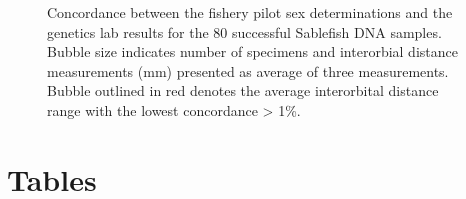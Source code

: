 \documentclass[12pt]{article}\usepackage[]{graphicx}\usepackage[]{color}
\begin{document}
\begin{figure}[htb]

 \hfill{}

\caption{Concordance between the fishery pilot sex determinations and the genetics lab results for the 80 successful Sablefish DNA samples. Bubble size indicates number of specimens and interorbial distance measurements (mm) presented as average of three measurements. Bubble outlined in red denotes the average interorbital distance range with the lowest concordance \textgreater{} 1\%.}\label{fig:figure5}
\end{figure}
\clearpage

\hypertarget{tables}{%
\section{Tables}\label{tables}}
\end{document}
